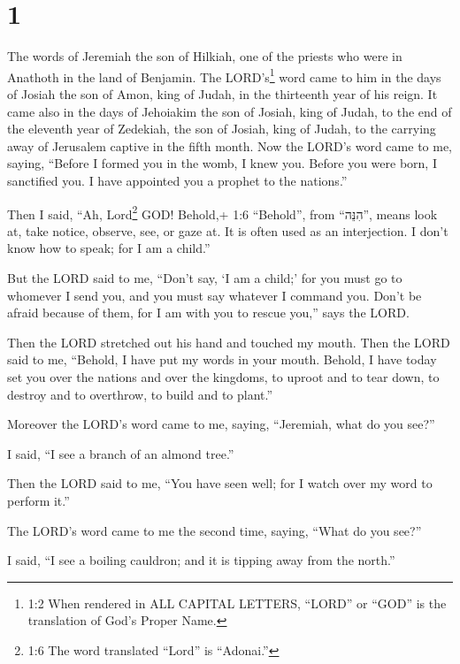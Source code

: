 \hypertarget{section}{%
\section{1}\label{section}}

 The words of Jeremiah the son of Hilkiah, one of the
priests who were in Anathoth in the land of Benjamin.  The
LORD's\footnote{1:2 When rendered in ALL CAPITAL LETTERS, ``LORD'' or
  ``GOD'' is the translation of God's Proper Name.} word came to him in
the days of Josiah the son of Amon, king of Judah, in the thirteenth
year of his reign.  It came also in the days of Jehoiakim
the son of Josiah, king of Judah, to the end of the eleventh year of
Zedekiah, the son of Josiah, king of Judah, to the carrying away of
Jerusalem captive in the fifth month.  Now the LORD's word
came to me, saying,  ``Before I formed you in the womb, I
knew you. Before you were born, I sanctified you. I have appointed you a
prophet to the nations.''

 Then I said, ``Ah, Lord\footnote{1:6 The word translated
  ``Lord'' is ``Adonai.''} GOD! Behold,+ 1:6 ``Behold'', from
``הִנֵּה'', means look at, take notice, observe, see, or gaze at. It is
often used as an interjection. I don't know how to speak; for I am a
child.''

 But the LORD said to me, ``Don't say, `I am a child;' for
you must go to whomever I send you, and you must say whatever I command
you.  Don't be afraid because of them, for I am with you to
rescue you,'' says the LORD.

 Then the LORD stretched out his hand and touched my mouth.
Then the LORD said to me, ``Behold, I have put my words in your mouth.
 Behold, I have today set you over the nations and over the
kingdoms, to uproot and to tear down, to destroy and to overthrow, to
build and to plant.''

 Moreover the LORD's word came to me, saying, ``Jeremiah,
what do you see?''

I said, ``I see a branch of an almond tree.''

 Then the LORD said to me, ``You have seen well; for I
watch over my word to perform it.''

 The LORD's word came to me the second time, saying, ``What
do you see?''

I said, ``I see a boiling cauldron; and it is tipping away from the
north.''

